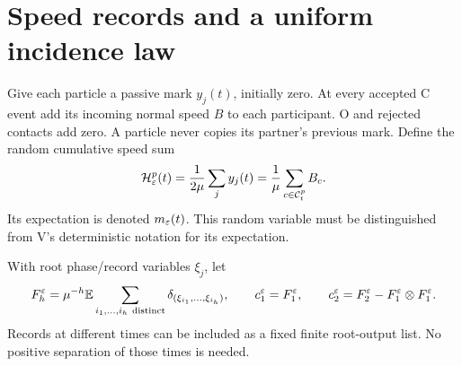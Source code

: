 \section{Speed records and a uniform incidence law}\label{sec:records}
Give each particle a passive mark $y_j(t)$, initially zero. At every accepted
C event add its incoming normal speed $B$ to each participant. O and rejected
contacts add zero. A particle never copies its partner's previous mark.
Define the random cumulative speed sum
\begin{equation}\label{eq:random-H}
 \mathcal H_\varepsilon^p(t)=\frac1{2\mu}\sum_j y_j(t)
             =\frac1\mu\sum_{c\in\mathcal C_t^p}B_c.
\end{equation}
Its expectation is denoted $m_\varepsilon(t)$. This random variable must be
distinguished from V's deterministic notation for its expectation.

With root phase/record variables $\xi_j$, let
\[
 F_h^\eps=\mu^{-h}\E\sum_{i_1,\ldots,i_h\ \text{distinct}}
                      \delta_{(\xi_{i_1},\ldots,\xi_{i_h})},
 \qquad c_1^\eps=F_1^\eps,\qquad
 c_2^\eps=F_2^\eps-F_1^\eps\otimes F_1^\eps.
\]
Records at different times can be included as a fixed finite root-output
list. No positive separation of those times is needed.

